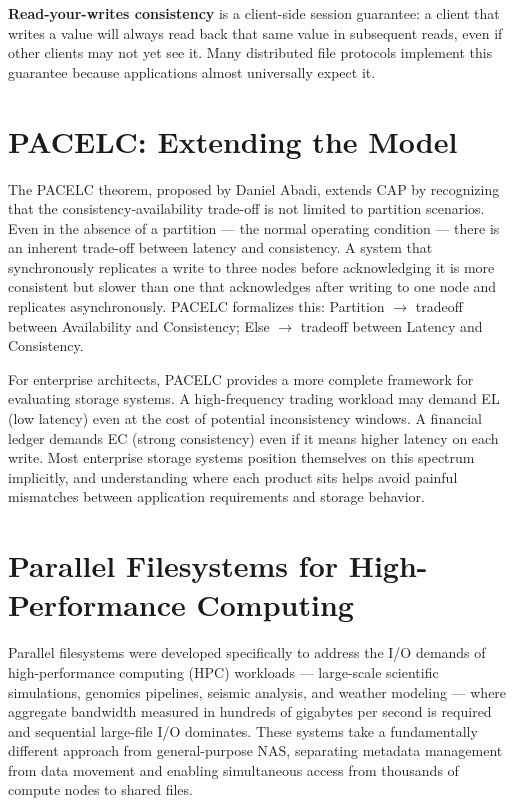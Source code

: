 \textbf{Read-your-writes consistency} is a client-side session guarantee: a client that writes a value will always read back that same value in subsequent reads, even if other clients may not yet see it. Many distributed file protocols implement this guarantee because applications almost universally expect it.

\section{PACELC: Extending the Model}
The PACELC theorem, proposed by Daniel Abadi, extends CAP by recognizing that the consistency-availability trade-off is not limited to partition scenarios. Even in the absence of a partition --- the normal operating condition --- there is an inherent trade-off between latency and consistency. A system that synchronously replicates a write to three nodes before acknowledging it is more consistent but slower than one that acknowledges after writing to one node and replicates asynchronously. PACELC formalizes this: Partition $\rightarrow$ tradeoff between Availability and Consistency; Else $\rightarrow$ tradeoff between Latency and Consistency.

For enterprise architects, PACELC provides a more complete framework for evaluating storage systems. A high-frequency trading workload may demand EL (low latency) even at the cost of potential inconsistency windows. A financial ledger demands EC (strong consistency) even if it means higher latency on each write. Most enterprise storage systems position themselves on this spectrum implicitly, and understanding where each product sits helps avoid painful mismatches between application requirements and storage behavior.

\section{Parallel Filesystems for High-Performance Computing}
Parallel filesystems were developed specifically to address the I/O demands of high-performance computing (HPC) workloads --- large-scale scientific simulations, genomics pipelines, seismic analysis, and weather modeling --- where aggregate bandwidth measured in hundreds of gigabytes per second is required and sequential large-file I/O dominates. These systems take a fundamentally different approach from general-purpose NAS, separating metadata management from data movement and enabling simultaneous access from thousands of compute nodes to shared files.

